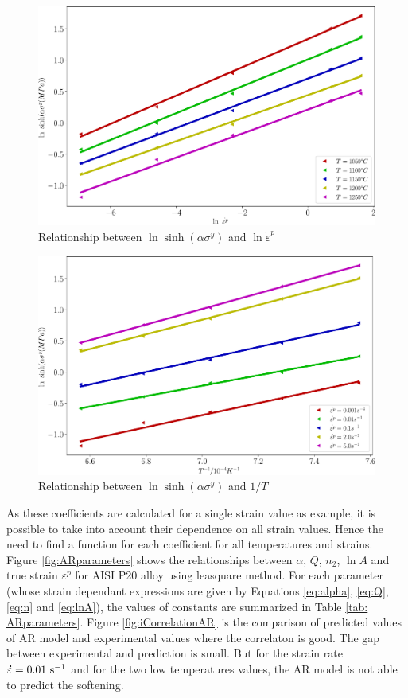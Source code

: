 \documentclass[twoside,english,1p,final,sort&compress]{elsarticle}
\theoremstyle{plain}
\newcommand{\mdot}[1]{\accentset{\mbox{\bfseries .}}{#1}}
\newcommand{\ps}{\text{s}^{-1}}
\begin{document}
\begin{figure}[!ht]
\centering
\includegraphics[width=0.9\columnwidth]{Figures/LnSinhE}
\caption{Relationship between $\ln \sinh(\alpha\sigma^y) $ and $\ln \dot{\varepsilon}^p$}
\label{fig:LnSinhE}
\end{figure}
\begin{figure}[!ht]
\centering
\includegraphics[width=0.9\columnwidth]{Figures/LnSinhT}
\caption{Relationship between $\ln \sinh(\alpha\sigma^y) $ and $1/T$}
\label{fig:LnSinhT}
\end{figure}
As these coefficients are calculated for a single strain value as example, it is possible to take into account their dependence on all strain values. Hence the need to find a function for each coefficient for all temperatures and strains. Figure  \ref{fig:ARparameters} shows the relationships between $\alpha$, $Q$, $n_2$, $\ln A$ and true strain $\varepsilon^p$ for AISI P20 alloy using leasquare method. For each parameter (whose strain dependant expressions are given by Equations \ref{eq:alpha}, \ref{eq:Q}, \ref{eq:n} and \ref{eq:lnA}), the values of constants are summarized in Table \ref{tab: ARparameters}. Figure \ref{fig:iCorrelationAR} is the comparison of predicted values of AR model and experimental values where the correlaton is good. The gap between experimental and prediction is small. But for the strain rate $\mdot\varepsilon = 0.01\ \ps$ and for the two low temperatures values, the AR model is not able to predict the softening.
\end{document}
